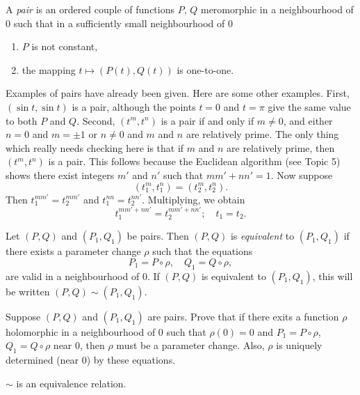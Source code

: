 \documentclass[a4paper,11pt]{article}
\begin{document}
\begin{defn}
  \label{def:2}
  A \emph{pair} is an ordered couple of functions $P$, $Q$ meromorphic
  in a neighbourhood of 0 such that in a sufficiently small
  neighbourhood of 0
  \begin{enumerate}
  \item $P$ is not constant,
  \item the mapping $t \mapsto (P(t), Q(t))$ is one-to-one.
  \end{enumerate}
\end{defn}

Examples of pairs have already been given.  Here are some other
examples.  First, $(\sin t,\sin t)$ is a pair, although the points $t
= 0$ and $t = \pi$ give the same value to both $P$ and $Q$.  Second,
$(t^m, t^n)$ is a pair if and only if $m \ne 0$, and either $n=0$ and
$m = \pm 1$ or $n\ne 0$ and $m$ and $n$ are relatively prime.  The
only thing which really needs checking here is that if $m$ and $n$ are
relatively prime, then $(t^m, t^n)$ is a pair.  This follows because
the Euclidean algorithm (see Topic 5) shows there exist integers
$m'$ and $n'$ such that $mm' + nn' = 1$.  Now suppose
$$
(t_1^m, t_1^n) = (t_2^m, t_2^n).
$$
Then $t_1^{mm'} = t_2^{mm'}$ and $t_1^{nn} = t_2^{nn'}$.  Multiplying,
we obtain
$$
t_1^{mm'+nn'} = t_2^{mm'+nn'};\quad
t_1 = t_2.
$$

\begin{defn}
  \label{def:3}
  Let $(P,Q)$ and $(P_1,Q_1)$ be pairs.  Then $(P,Q)$ is
  \emph{equivalent} to $(P_1,Q_1)$ if there exists a parameter change
  $\rho$ such that the equations
  $$
  P_1 = P\circ \rho,\quad
  Q_1 = Q\circ \rho,
  $$
  are valid in a neighbourhood of 0.  If $(P,Q)$ is equivalent to
  $(P_1, Q_1)$, this will be written $(P,Q) \sim (P_1,Q_1)$.
\end{defn}

\begin{ques}
  \label{problem:3}
  Suppose $(P,Q)$ and $(P_1,Q_1)$ are pairs.  Prove that if there
  exits a function $\rho$ holomorphic in a neighbourhood of 0 such
  that $\rho(0) = 0$ and $P_1 = P\circ \rho$, $Q_1 = Q \circ \rho$
  near 0, then $\rho$ must be a parameter change.  Also, $\rho$ is
  uniquely determined (near 0) by these equations.
\end{ques}

\begin{lem}
  \label{lem:1}
  $\sim$ is an equivalence relation.
\end{lem}
\end{document}
